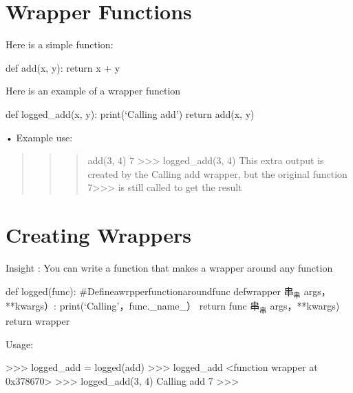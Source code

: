 \documentclass[
  letterpaper,
  DIV=11,
  numbers=noendperiod]{scrreprt}
\newenvironment{Shaded}{\begin{snugshade}}{\end{snugshade}}
\newcommand{\NormalTok}[1]{\textcolor[rgb]{0.00,0.23,0.31}{#1}}
\begin{document}

\chapter{Wrapper Functions}\label{wrapper-functions}

Here is a simple function:

def add(x, y): return x + y

Here is an example of a wrapper function

def logged\_add(x, y): print(`Calling add') return add(x, y)

• Example use:

\begin{quote}
\begin{quote}
\begin{quote}
add(3, 4) 7 \textgreater\textgreater\textgreater{} logged\_add(3, 4)
This extra output is created by the Calling add wrapper, but the
original function 7\textgreater\textgreater\textgreater{} is still
called to get the result
\end{quote}
\end{quote}
\end{quote}


\chapter{Creating Wrappers}\label{creating-wrappers}

Insight : You can write a function that makes a wrapper around any
function

def logged(func): \#Defineawrpperfunctionaroundfunc defwrapper
\(\text{串} _ { \text{串} }\) args，**kwargs）:
print(`Calling'，func.\_name\_） return func
\(\text{串} _ { \text{串} }\) args，**kwargs) return wrapper

Usage:

\begin{Shaded}
\begin{Highlighting}[]
\NormalTok{\textgreater{}\textgreater{}\textgreater{} logged\_add = logged(add)  }
\NormalTok{\textgreater{}\textgreater{}\textgreater{} logged\_add  }
\NormalTok{\textless{}function wrapper at 0x378670\textgreater{}  }
\NormalTok{\textgreater{}\textgreater{}\textgreater{} logged\_add(3, 4)  }
\NormalTok{Calling add  }
\NormalTok{7  }
\NormalTok{\textgreater{}\textgreater{}\textgreater{} }
\end{Highlighting}
\end{Shaded}
\end{document}
